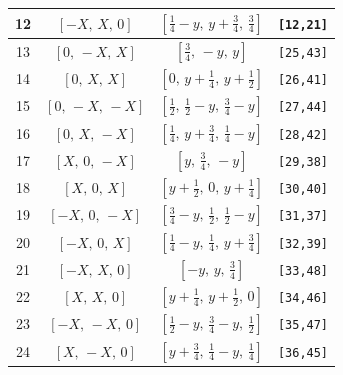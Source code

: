 \documentclass[fleqn,8pt]{jsarticle}
\begin{document}
\begin{longtable}{cccc}
12 & $\left[ - X,\, X,\, 0 \right]$ & $\left[ \frac{1}{4} - y,\, y + \frac{3}{4},\, \frac{3}{4} \right]$ & {\tt [12,21]} \\ \hline
13 & $\left[ 0,\, - X,\, X \right]$ & $\left[ \frac{3}{4},\, - y,\, y \right]$ & {\tt [25,43]} \\ \hline
14 & $\left[ 0,\, X,\, X \right]$ & $\left[ 0,\, y + \frac{1}{4},\, y + \frac{1}{2} \right]$ & {\tt [26,41]} \\ \hline
15 & $\left[ 0,\, - X,\, - X \right]$ & $\left[ \frac{1}{2},\, \frac{1}{2} - y,\, \frac{3}{4} - y \right]$ & {\tt [27,44]} \\ \hline
16 & $\left[ 0,\, X,\, - X \right]$ & $\left[ \frac{1}{4},\, y + \frac{3}{4},\, \frac{1}{4} - y \right]$ & {\tt [28,42]} \\ \hline
17 & $\left[ X,\, 0,\, - X \right]$ & $\left[ y,\, \frac{3}{4},\, - y \right]$ & {\tt [29,38]} \\ \hline
18 & $\left[ X,\, 0,\, X \right]$ & $\left[ y + \frac{1}{2},\, 0,\, y + \frac{1}{4} \right]$ & {\tt [30,40]} \\ \hline
19 & $\left[ - X,\, 0,\, - X \right]$ & $\left[ \frac{3}{4} - y,\, \frac{1}{2},\, \frac{1}{2} - y \right]$ & {\tt [31,37]} \\ \hline
20 & $\left[ - X,\, 0,\, X \right]$ & $\left[ \frac{1}{4} - y,\, \frac{1}{4},\, y + \frac{3}{4} \right]$ & {\tt [32,39]} \\ \hline
21 & $\left[ - X,\, X,\, 0 \right]$ & $\left[ - y,\, y,\, \frac{3}{4} \right]$ & {\tt [33,48]} \\ \hline
22 & $\left[ X,\, X,\, 0 \right]$ & $\left[ y + \frac{1}{4},\, y + \frac{1}{2},\, 0 \right]$ & {\tt [34,46]} \\ \hline
23 & $\left[ - X,\, - X,\, 0 \right]$ & $\left[ \frac{1}{2} - y,\, \frac{3}{4} - y,\, \frac{1}{2} \right]$ & {\tt [35,47]} \\ \hline
24 & $\left[ X,\, - X,\, 0 \right]$ & $\left[ y + \frac{3}{4},\, \frac{1}{4} - y,\, \frac{1}{4} \right]$ & {\tt [36,45]} \\
\end{longtable}
\renewcommand{\arraystretch}{1.2}
\end{document}
